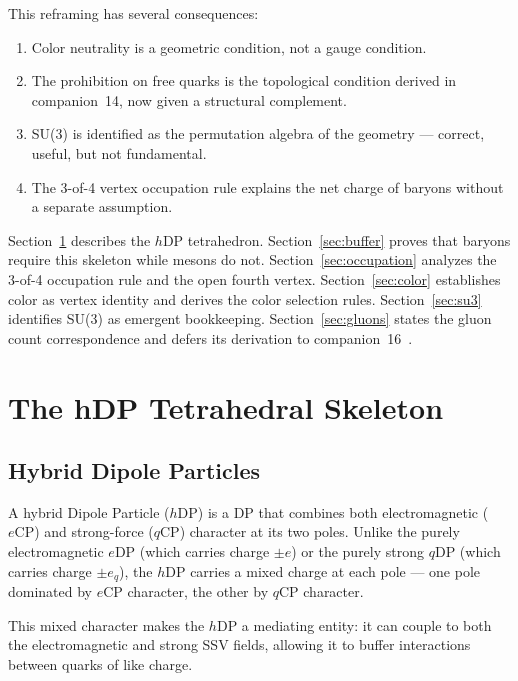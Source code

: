 \documentclass[12pt]{article}
\newcommand{\eCP}{e\mathrm{CP}}
\newcommand{\qCP}{q\mathrm{CP}}
\newcommand{\eDP}{e\mathrm{DP}}
\newcommand{\qDP}{q\mathrm{DP}}
\newcommand{\hDP}{h\mathrm{DP}}
\begin{document}
This reframing has several consequences:
\begin{enumerate}[noitemsep]
\item Color neutrality is a geometric condition, not a gauge condition.
\item The prohibition on free quarks is the topological condition
  derived in companion~14, now given a structural complement.
\item SU(3) is identified as the permutation algebra of the geometry
  --- correct, useful, but not fundamental.
\item The 3-of-4 vertex occupation rule explains the net charge of
  baryons without a separate assumption.
\end{enumerate}

Section~\ref{sec:hdp} describes the $\hDP$ tetrahedron.
Section~\ref{sec:buffer} proves that baryons require this skeleton
while mesons do not.  Section~\ref{sec:occupation} analyzes the
3-of-4 occupation rule and the open fourth vertex.
Section~\ref{sec:color} establishes color as vertex identity and
derives the color selection rules.  Section~\ref{sec:su3} identifies
SU(3) as emergent bookkeeping.  Section~\ref{sec:gluons} states the
gluon count correspondence and defers its derivation to
companion~16~\cite{c16}.

\section{The hDP Tetrahedral Skeleton}
\label{sec:hdp}

\subsection{Hybrid Dipole Particles}

A hybrid Dipole Particle ($\hDP$) is a DP that combines both
electromagnetic ($\eCP$) and strong-force ($\qCP$) character at its
two poles.  Unlike the purely electromagnetic $\eDP$ (which carries
charge $\pm e$) or the purely strong $\qDP$ (which carries charge
$\pm e_q$), the $\hDP$ carries a mixed charge at each pole --- one
pole dominated by $\eCP$ character, the other by $\qCP$ character.

This mixed character makes the $\hDP$ a mediating entity: it can
couple to both the electromagnetic and strong SSV fields, allowing it
to buffer interactions between quarks of like charge.
\end{document}
